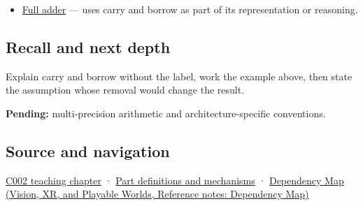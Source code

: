 \hypertarget{appendix-d52d5f78ffd1-used-by}{}

\begin{itemize}
\tightlist
\item
  \hyperref[appendix-d1a5b1e520c2]{Full adder} --- uses carry and borrow as part of its representation or reasoning.
\end{itemize}

\subsection{Recall and next depth}\label{appendix-d52d5f78ffd1-recall-and-next-depth}

\hypertarget{appendix-d52d5f78ffd1-recall-and-next-depth}{}

Explain carry and borrow without the label, work the example above, then state the assumption whose removal would change the result.

\textbf{Pending:} multi-precision arithmetic and architecture-specific conventions.

\subsection{Source and navigation}\label{appendix-d52d5f78ffd1-source-and-navigation}

\hypertarget{appendix-d52d5f78ffd1-source-and-navigation}{}

\hyperref[01-foundations-i-ch001-arithmetic-becomes-a-policy]{C002 teaching chapter} · \hyperref[appendix-fd090d982a15]{Part definitions and mechanisms} · \href{../07-Vision-XR-and-Playable-Worlds/main.pdf\#nameddest=appendix-4ad47bdd269a}{Dependency Map (Vision, XR, and Playable Worlds, Reference notes: Dependency Map)}
